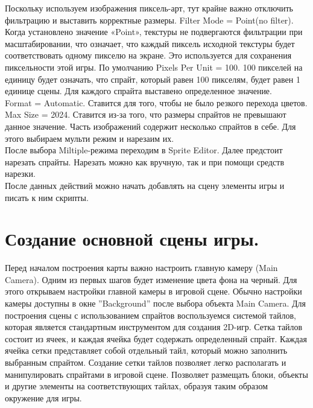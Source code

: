 Поскольку используем изображения пиксель-арт, тут крайне важно отключить фильтрацию и выставить корректные размеры.
Filter Mode = Point(no filter). Когда установлено значение «Point», текстуры не подвергаются фильтрации при масштабировании, что означает, что каждый пиксель исходной текстуры будет соответствовать одному пикселю на экране. Это используется для сохранения пиксельности этой игры. По умолчанию Pixels Per Unit = 100. 100 пикселей на единицу будет
означать, что спрайт, который равен 100 пикселям, будет равен 1 единице сцены. Для каждого спрайта выставено определенное значение.\\ 
Format = Automatic. Ставится для того, чтобы не было резкого перехода цветов.\\
Max Size = 2024. Ставится из-за того, что размеры спрайтов не превышают данное значение.
Часть изображений содержит несколько спрайтов в себе. Для этого выбираем мульти режим и нарезаим их.\\
После выбора Miltiple-режима переходим в Sprite Editor. Далее предстоит нарезать спрайты. Нарезать можно как вручную, так и при помощи
средств нарезки.\\
После данных действий можно начать добавлять на сцену элементы игры и писать к ним скрипты.
\section{\label{}Создание основной сцены игры.}
Перед началом построения карты важно настроить главную камеру
(Main Camera). Одним из первых шагов будет изменение цвета фона на черный.
Для этого открываем настройки главной камеры в игровой сцене. Обычно настройки камеры доступны в окне ”Background” после выбора объекта Main Camera. Для построения сцены с использованием спрайтов воспользуемся системой тайлов, которая является стандартным инструментом для создания 2D-игр. Сетка тайлов состоит из ячеек, и каждая ячейка будет содержать определенный спрайт. Каждая ячейка сетки представляет собой отдельный
тайл, который можно заполнить выбранным спрайтом. Создание сетки тайлов позволяет легко располагать и манипулировать спрайтами в игровой сцене. Позволяет размещать блоки, объекты и другие элементы на соответствующих тайлах, образуя таким образом окружение для
игры.
